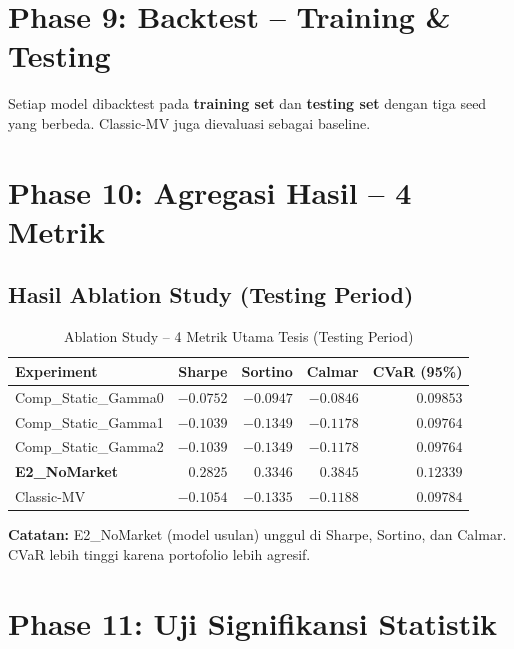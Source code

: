 \documentclass[12pt,a4paper]{article}
\begin{document}
\section{Phase 9: Backtest -- Training \& Testing}

Setiap model dibacktest pada \textbf{training set} dan \textbf{testing set} dengan tiga seed yang berbeda. Classic-MV juga dievaluasi sebagai baseline.

\section{Phase 10: Agregasi Hasil -- 4 Metrik}

\subsection{Hasil Ablation Study (Testing Period)}

\begin{table}[h!]
\centering
\begin{tabular}{@{}lrrrr@{}}
\toprule
\textbf{Experiment} & \textbf{Sharpe} & \textbf{Sortino} & \textbf{Calmar} & \textbf{CVaR (95\%)} \\
\midrule
Comp\_Static\_Gamma0 & $-0.0752$ & $-0.0947$ & $-0.0846$ & $0.09853$ \\
Comp\_Static\_Gamma1 & $-0.1039$ & $-0.1349$ & $-0.1178$ & $0.09764$ \\
Comp\_Static\_Gamma2 & $-0.1039$ & $-0.1349$ & $-0.1178$ & $0.09764$ \\
\textbf{E2\_NoMarket} & $\mathbf{0.2825}$ & $\mathbf{0.3346}$ & $\mathbf{0.3845}$ & $0.12339$ \\
Classic-MV           & $-0.1054$ & $-0.1335$ & $-0.1188$ & $0.09784$ \\
\bottomrule
\end{tabular}
\caption{Ablation Study -- 4 Metrik Utama Tesis (Testing Period)}
\end{table}

\noindent\textbf{Catatan:} E2\_NoMarket (model usulan) unggul di Sharpe, Sortino, dan Calmar. CVaR lebih tinggi karena portofolio lebih agresif.

\section{Phase 11: Uji Signifikansi Statistik}
\end{document}
